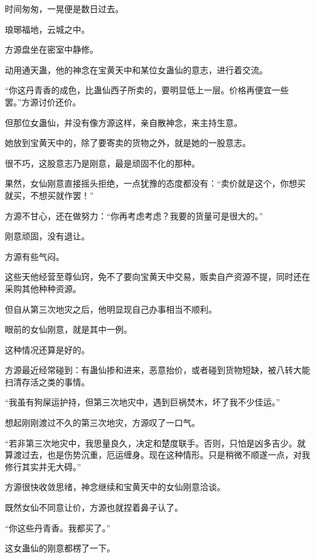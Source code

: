 
\begin{this_body}



时间匆匆，一晃便是数日过去。

琅琊福地，云城之中。

方源盘坐在密室中静修。

动用通天蛊，他的神念在宝黄天中和某位女蛊仙的意志，进行着交流。

“你这丹青香的成色，比蛊仙西子所卖的，要明显低上一层。价格再便宜一些罢。”方源讨价还价。

但那位女蛊仙，并没有像方源这样，亲自散神念，来主持生意。

她放到宝黄天中的，除了要寄卖的货物之外，就是她的一股意志。

很不巧，这股意志乃是刚意，最是顽固不化的那种。

果然，女仙刚意直接摇头拒绝，一点犹豫的态度都没有：“卖价就是这个，你想买就买，不想买就作罢！”

方源不甘心，还在做努力：“你再考虑考虑？我要的货量可是很大的。”

刚意顽固，没有退让。

方源有些气闷。

这些天他经营至尊仙窍，免不了要向宝黄天中交易，贩卖自产资源不提，同时还在采购其他种种资源。

但自从第三次地灾之后，他明显现自己办事相当不顺利。

眼前的女仙刚意，就是其中一例。

这种情况还算是好的。

方源最近经常碰到：有蛊仙掺和进来，恶意抬价，或者碰到货物短缺，被八转大能扫清存活之类的事情。

“我虽有狗屎运护持，但第三次地灾中，遇到巨祸焚木，坏了我不少佳运。”

想起刚刚渡过不久的第三次地灾，方源叹了一口气。

“若非第三次地灾中，我思量良久，决定和楚度联手。否则，只怕是凶多吉少。就算渡过去，也是伤势沉重，厄运缠身。现在这种情形。只是稍微不顺遂一点，对我修行其实并无大碍。”

方源很快收敛思绪，神念继续和宝黄天中的女仙刚意洽谈。

既然女仙不同意让价，方源也就捏着鼻子认了。

“你这些丹青香。我都买了。”

这女蛊仙的刚意都楞了一下。


\end{this_body}
